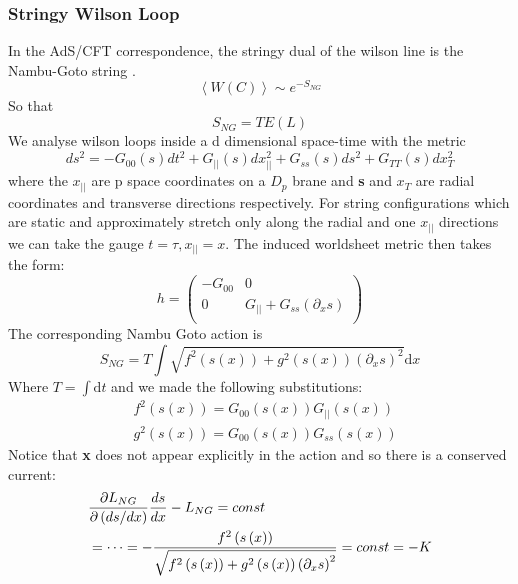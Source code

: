 \documentclass[11pt,a4paper]{article}
\begin{document}
\subsubsection{Stringy Wilson Loop}
In the AdS/CFT correspondence, the stringy dual of the wilson line is the Nambu-Goto string \cite{Maldacena98}.
\begin{equation}
\left\langle W\left(C\right)\right\rangle\sim e^{-S_{NG}}
\end{equation}
So that
\begin{equation}
S_{NG}=TE\left(L\right)
\end{equation}
We analyse wilson loops inside a d dimensional space-time with the metric \cite{Kinar99}
\begin{equation}
ds^2=-G_{00}\left(s\right)dt^2+G_{||}\left(s\right)dx_{||}^2+G_{ss}\left(s\right)ds^2+G_{TT}\left(s\right)dx_T^2
\end{equation}
where the $x_{||}$ are p space coordinates on a $D_p$ brane and \textbf{s} and $x_T$ are radial coordinates and transverse directions respectively. For string configurations which are static and approximately stretch only along the radial and one $x_{||}$ directions we can take the gauge $t=\tau, x_{||}=x$. The induced worldsheet metric then takes the form:
\begin{equation}
h=
\begin{pmatrix}
-G_{00}	& 0 \\
0		& G_{||}+G_{ss}\left(\partial_{x}s\right) \\ 
\end{pmatrix}
\end{equation} 
The corresponding Nambu Goto action is
\begin{equation}
S_{NG}=T\int\sqrt{f^2\left(s\left(x\right)\right)+g^2\left(s\left(x\right)\right)\left(\partial_xs\right)^2}\mathrm{d}x
\end{equation}
Where $T=\int\mathrm{d}t$ and we made the following substitutions:
\begin{subequations}
\begin{align}
&f^2\left(s\left(x\right)\right)=G_{00}\left(s\left(x\right)\right)G_{||}\left(s\left(x\right)\right)\\
&g^2\left(s\left(x\right)\right)=G_{00}\left(s\left(x\right)\right)G_{ss}\left(s\left(x\right)\right)
\end{align}
\end{subequations}
Notice that \textbf{x} does not appear explicitly in the action and so there is a conserved current:
\begin{align}
&\frac{\partial L_{NG}}{\partial \left(ds/dx\right)}\frac{ds}{dx}-L_{NG}=const \notag \\
&=\cdots=-\frac{f^2\left(s\left(x\right)\right)}{\sqrt{f^2\left(s\left(x\right)\right)+g^2\left(s\left(x\right)\right)\left(\partial_xs\right)^2}}=const=-K
\end{align}
\end{document}
